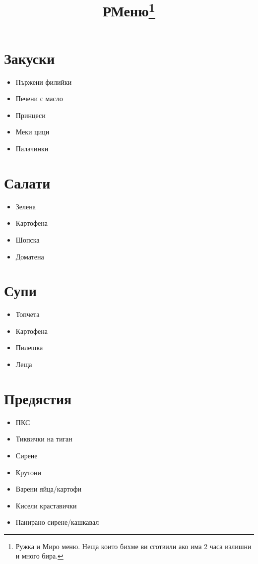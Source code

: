 \documentclass{article}
\title{РМеню\footnote{Ружка и Миро меню. Неща които бихме ви сготвили ако има 2 часа излишни и много бира.}}
\newenvironment{mylist}
{
  \begin{itemize}
  \setlength{\itemsep}{1pt}
  \setlength{\parskip}{0pt}
  \setlength{\parsep}{0pt}
}
{
\end{itemize}
}
\begin{document}
\maketitle
\begin{multicols}{2}
\section{Закуски}
\begin{mylist}
    \item{Пържени филийки}
    \item{Печени с масло}
    \item{Принцеси}
    \item{Меки цици}
    \item{Палачинки}
\end{mylist}

\section{Салати}
\begin{mylist}
    \item{Зелена}
    \item{Картофена}
    \item{Шопска}
    \item{Доматена}
\end{mylist}

\section{Супи}
\begin{mylist}
    \item{Топчета}
    \item{Картофена}
    \item{Пилешка}
    \item{Леща}
\end{mylist}

\section{Предястия}
\begin{mylist}
    \item{ПКС}
    \item{Тиквички на тиган}
    \item{Сирене}
    \item{Крутони}
    \item{Варени яйца/картофи}
    \item{Кисели краставички}
    \item{Панирано сирене/кашкавал}
\end{mylist}


\end{multicols}
\end{document}
